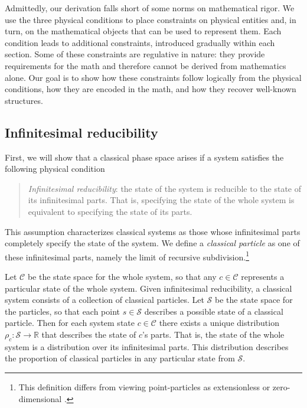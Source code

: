 \documentclass[12pt, english, twoside]{article} %
\newcommand\bs{\begin{singlespace}}
\newcommand\es{\end{singlespace}}
\begin{document}
Admittedly, our derivation falls short of some norms on mathematical rigor. We use the three physical conditions to place constraints on physical entities and, in turn, on the mathematical objects that can be used to represent them. Each condition leads to additional constraints, introduced gradually within each section.  Some of these constraints are regulative in nature: they provide requirements for the math and therefore cannot be derived from mathematics alone. Our goal is to show how these constraints follow logically from the physical conditions, how they are encoded in the math, and how they recover well-known structures.

\subsection{Infinitesimal reducibility}
\label{infinitesimal}

First, we will show that a classical phase space arises if a system satisfies the following physical condition 


\begin{quotation}
\bs \noindent
\textit{Infinitesimal reducibility}: the state of the system is reducible to the state of its infinitesimal parts. That is, specifying the state of the whole system is equivalent to specifying the state of its parts.
\es
\end{quotation}


\noindent
This assumption characterizes classical systems as those whose infinitesimal parts completely specify the state of the system. We define a \textit{classical particle} as one of these infinitesimal parts, namely the limit of recursive subdivision.\footnote{This definition differs from viewing point-particles as extensionless \parencites[]{Butterfieldpoints} or zero-dimensional \parencites[]{Wilson}.}

Let $\mathcal{C}$ be the state space for the whole system, so that any $c \in \mathcal{C}$ represents a particular state of the whole system. Given infinitesimal reducibility, a classical system consists of a collection of classical particles. Let $\mathcal{S}$ be the state space for the particles, so that each point $s \in \mathcal{S}$ describes a possible state of a classical particle. Then for each system state $c \in \mathcal{C}$ there exists a unique distribution $\rho_c : \mathcal{S} \to \mathbb{R} $ that describes the state of $c$'s parts. That is, the state of the whole system is a distribution over its infinitesimal parts. This distribution describes the proportion of classical particles in any particular state from $\mathcal{S}$.
\end{document}
